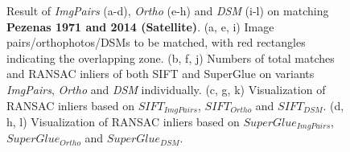 \begin{figure}[htbp]
\begin{center}
{\begin{minipage}[t]{0.48\linewidth}
			\end{minipage}%
		}
		\caption{{ Result of \textit{ImgPairs} (a-d), \textit{Ortho} (e-h) and \textit{DSM} (i-l) on matching \textbf{Pezenas 1971 and 2014 (Satellite)}. (a, e, i) Image pairs/orthophotos/DSMs to be matched, with red rectangles indicating the overlapping zone. (b, f, j) Numbers of total matches and RANSAC inliers of both SIFT and SuperGlue on variants \textit{ImgPairs}, \textit{Ortho} and \textit{DSM} individually. (c, g, k) Visualization of RANSAC inliers based on $SIFT_{ImgPairs}$, $SIFT_{Ortho}$ and $SIFT_{DSM}$. (d, h, l) Visualization of RANSAC inliers based on $SuperGlue_{ImgPairs}$, $SuperGlue_{Ortho}$ and $SuperGlue_{DSM}$.}}        
		\label{MatchVizPezenas-Satellite1971DSM}
	\end{center}
\end{figure} 



